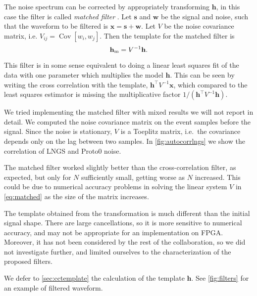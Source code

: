 The noise spectrum can be corrected by appropriately transforming $\mathbf h$,
in this case the filter is called \emph{matched filter}
\cite[161]{ferrante2015}. Let $\mathbf s$ and $\mathbf w$ be the signal and
noise, such that the waveform to be filtered is $\mathbf x = \mathbf s +
\mathbf w$. Let $V$ be the noise covariance matrix, i.e. $V_{ij} =
\operatorname{Cov}[w_i, w_j]$. Then the template for the matched filter is
%
\begin{equation}
    \mathbf h_\text m = V^{-1} \mathbf h.
    \label{eq:matched}    
\end{equation}

This filter is in some sense equivalent to doing a linear least squares fit of
the data with one parameter which multiplies the model $\mathbf h$. This can be
seen by writing the cross correlation with the template, $\mathbf h^\top V^{-1}
\mathbf x$, which compared to the least squares estimator \cite[628]{zyla2020}
is missing the multiplicative factor $1/(\mathbf h^\top V^{-1} \mathbf h)$.

We tried implementing the matched filter with mixed results we will not report
in detail. We computed the noise covariance matrix on the event samples before
the signal. Since the noise is stationary, $V$ is a Toeplitz matrix, i.e.\ the
covariance depends only on the lag between two samples. In
\autoref{fig:autocorrlngs} we show the correlation of LNGS and Proto0 noise.

The matched filter worked slightly better than the cross-correlation filter, as
expected, but only for $N$ sufficiently small, getting worse as $N$ increased.
This could be due to numerical accuracy problems in solving the linear system
$V$ in \autoref{eq:matched} as the size of the matrix increases.

The template obtained from the transformation is much different than the
initial signal shape. There are large cancellations, so it is more sensitive to
numerical accuracy, and may not be appropriate for an implementation on FPGA.
Moreover, it has not been considered by the rest of the collaboration, so we
did not investigate further, and limited ourselves to the characterization of
the proposed filters.

We defer to \autoref{sec:cctemplate} the calculation of the template $\mathbf
h$. See \autoref{fig:filters} for an example of filtered waveform.

\begin{figure}
    
    

\end{figure}

